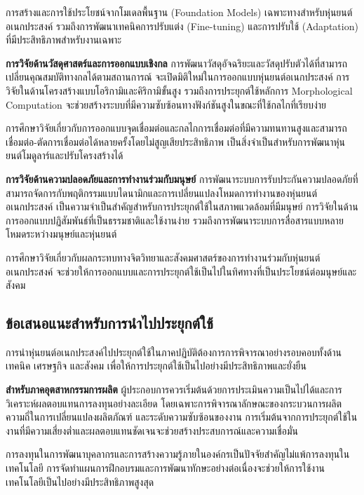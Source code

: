 \documentclass[a4paper]{article}
\begin{document}
การสร้างและการใช้ประโยชน์จากโมเดลพื้นฐาน (Foundation Models) เฉพาะทางสำหรับหุ่นยนต์อเนกประสงค์ รวมถึงการพัฒนาเทคนิคการปรับแต่ง (Fine-tuning) และการปรับใช้ (Adaptation) ที่มีประสิทธิภาพสำหรับงานเฉพาะ

\textbf{การวิจัยด้านวัสดุศาสตร์และการออกแบบเชิงกล} การพัฒนาวัสดุอัจฉริยะและวัสดุปรับตัวได้ที่สามารถเปลี่ยนคุณสมบัติทางกลได้ตามสถานการณ์ จะเปิดมิติใหม่ในการออกแบบหุ่นยนต์อเนกประสงค์ การวิจัยในด้านโครงสร้างแบบโอริกามิและคิริกามิขั้นสูง รวมถึงการประยุกต์ใช้หลักการ Morphological Computation จะช่วยสร้างระบบที่มีความซับซ้อนทางฟังก์ชันสูงในขณะที่ใช้กลไกที่เรียบง่าย

การศึกษาวิจัยเกี่ยวกับการออกแบบจุดเชื่อมต่อและกลไกการเชื่อมต่อที่มีความทนทานสูงและสามารถเชื่อมต่อ-ตัดการเชื่อมต่อได้หลายครั้งโดยไม่สูญเสียประสิทธิภาพ เป็นสิ่งจำเป็นสำหรับการพัฒนาหุ่นยนต์โมดูลาร์และปรับโครงสร้างได้

\textbf{การวิจัยด้านความปลอดภัยและการทำงานร่วมกับมนุษย์} การพัฒนาระบบการรับประกันความปลอดภัยที่สามารถจัดการกับพฤติกรรมแบบไดนามิกและการเปลี่ยนแปลงโหมดการทำงานของหุ่นยนต์อเนกประสงค์ เป็นความจำเป็นสำคัญสำหรับการประยุกต์ใช้ในสภาพแวดล้อมที่มีมนุษย์ การวิจัยในด้านการออกแบบปฏิสัมพันธ์ที่เป็นธรรมชาติและใช้งานง่าย รวมถึงการพัฒนาระบบการสื่อสารแบบหลายโหมดระหว่างมนุษย์และหุ่นยนต์

การศึกษาวิจัยเกี่ยวกับผลกระทบทางจิตวิทยาและสังคมศาสตร์ของการทำงานร่วมกับหุ่นยนต์อเนกประสงค์ จะช่วยให้การออกแบบและการประยุกต์ใช้เป็นไปในทิศทางที่เป็นประโยชน์ต่อมนุษย์และสังคม

\subsection{ข้อเสนอแนะสำหรับการนำไปประยุกต์ใช้}

การนำหุ่นยนต์อเนกประสงค์ไปประยุกต์ใช้ในภาคปฏิบัติต้องการการพิจารณาอย่างรอบคอบทั้งด้านเทคนิค เศรษฐกิจ และสังคม เพื่อให้การประยุกต์ใช้เป็นไปอย่างมีประสิทธิภาพและยั่งยืน

\textbf{สำหรับภาคอุตสาหกรรมการผลิต} ผู้ประกอบการควรเริ่มต้นด้วยการประเมินความเป็นไปได้และการวิเคราะห์ผลตอบแทนการลงทุนอย่างละเอียด โดยเฉพาะการพิจารณาลักษณะของกระบวนการผลิต ความถี่ในการเปลี่ยนแปลงผลิตภัณฑ์ และระดับความซับซ้อนของงาน การเริ่มต้นจากการประยุกต์ใช้ในงานที่มีความเสี่ยงต่ำและผลตอบแทนชัดเจนจะช่วยสร้างประสบการณ์และความเชื่อมั่น

การลงทุนในการพัฒนาบุคลากรและการสร้างความรู้ภายในองค์กรเป็นปัจจัยสำคัญไม่แพ้การลงทุนในเทคโนโลยี การจัดทำแผนการฝึกอบรมและการพัฒนาทักษะอย่างต่อเนื่องจะช่วยให้การใช้งานเทคโนโลยีเป็นไปอย่างมีประสิทธิภาพสูงสุด
\end{document}
